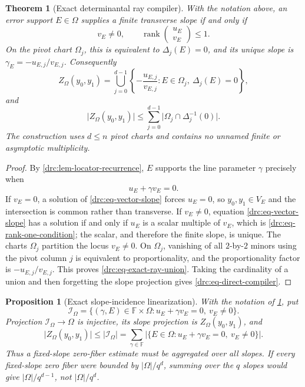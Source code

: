 \documentclass[11pt,a4paper]{amsart}
\numberwithin{equation}{section}
\newtheorem{theorem}{Theorem}[section]
\newtheorem{proposition}[proposition]{Proposition}
\theoremstyle{remark}
\DeclareMathOperator{\rank}{rank}
\newcommand{\F}{\mathbb F}
\newcommand{\Ical}{\mathcal I}
\newcommand{\abs}[1]{\lvert #1\rvert}
\begin{document}
\begin{theorem}[Exact determinantal ray compiler]
\label{drc:thm-exact-compiler}
With the notation above, an error support \(E\in\Omega\) supplies a finite
transverse slope if and only if
\[
 v_E\ne0,
 \qquad
 \rank\begin{pmatrix}u_E\\v_E\end{pmatrix}\le1.
 \tag{DR6}\label{drc:eq-rank-one-condition}
\]
On the pivot chart \(\Omega_j\), this is equivalent to
\(\Delta_j(E)=0\), and its unique slope is
\(
 \gamma_E=-u_{E,j}/v_{E,j}
\).  Consequently
\[
 Z_\Omega(y_0,y_1)=
 \bigcup_{j=0}^{d-1}
 \left\{-\frac{u_{E,j}}{v_{E,j}}:
       E\in\Omega_j,\ \Delta_j(E)=0\right\},
 \tag{DR7}\label{drc:eq-exact-ray-union}
\]
and
\[
 \abs{Z_\Omega(y_0,y_1)}
 \le
 \sum_{j=0}^{d-1}
 \abs{\Omega_j\cap\Delta_j^{-1}(0)}.
 \tag{DRC}\label{drc:eq-direct-compiler}
\]
The construction uses \(d\le n\) pivot charts and contains no unnamed
finite or asymptotic multiplicity.
\end{theorem}

\begin{proof}
By \cref{drc:lem-locator-recurrence}, \(E\) supports the line parameter
\(\gamma\) precisely when
\[
                         u_E+\gamma v_E=0.
                         \tag{DR8}\label{drc:eq-vector-slope}
\]
If \(v_E=0\), a solution of \eqref{drc:eq-vector-slope} forces \(u_E=0\),
so \(y_0,y_1\in V_E\) and the intersection is common rather than
transverse.  If \(v_E\ne0\), equation
\eqref{drc:eq-vector-slope} has a solution if and only if \(u_E\) is a
scalar multiple of \(v_E\), which is
\eqref{drc:eq-rank-one-condition}; the scalar, and therefore the finite
slope, is unique.  The charts \(\Omega_j\) partition the locus
\(v_E\ne0\).  On \(\Omega_j\), vanishing of all \(2\)-by-\(2\) minors
using the pivot column \(j\) is equivalent to proportionality, and the
proportionality factor is \(-u_{E,j}/v_{E,j}\).  This proves
\eqref{drc:eq-exact-ray-union}.  Taking the cardinality of a union and then
forgetting the slope projection gives \eqref{drc:eq-direct-compiler}.
\end{proof}

\begin{proposition}[Exact slope-incidence linearization]
\label{drc:prop-exact-slope-linearization}
With the notation of \cref{drc:thm-exact-compiler}, put
\[
 \Ical_\Omega=
 \{(\gamma,E)\in\F\times\Omega:
                 u_E+\gamma v_E=0,\ v_E\ne0\}.
 \tag{DRC1}\label{drc:eq-slope-incidence}
\]
Projection \(\Ical_\Omega\to\Omega\) is injective, its slope projection
is \(Z_\Omega(y_0,y_1)\), and
\[
 \abs{Z_\Omega(y_0,y_1)}
 \le\abs{\Ical_\Omega}
 =\sum_{\gamma\in\F}
   \abs{\{E\in\Omega:u_E+\gamma v_E=0,\ v_E\ne0\}}. \tag{DRC2}
\label{drc:eq-slope-sum}
\]
Thus a fixed-slope zero-fiber estimate must be aggregated over all slopes.
If every fixed-slope zero fiber were bounded by \(\abs\Omega/q^d\),
summing over the \(q\) slopes would give \(\abs\Omega/q^{d-1}\), not
\(\abs\Omega/q^d\).
\end{proposition}
\end{document}
